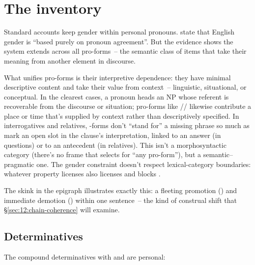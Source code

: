 \section{The inventory}
\label{sec:12:inventory}

Standard accounts keep gender within personal pronouns. \textcite[486]{huddleston2002} state that English gender is \enquote{based purely on pronoun agreement}. But the evidence shows the system extends across all pro-forms~-- the semantic class of items that take their meaning from another element in discourse.

What unifies pro-forms is their interpretive dependence: they have minimal
descriptive content and take their value from context~-- linguistic,
situational, or conceptual. In the clearest cases, a pronoun heads an NP
whose referent is recoverable from the discourse or situation; pro-forms like
// likewise contribute a place or
time that's supplied by context rather than descriptively specified. In
interrogatives and relatives, -forms don't \enquote{stand for} a missing
phrase so much as mark an open slot in the clause's interpretation, linked to
an answer (in questions) or to an antecedent (in relatives). This isn't a
morphosyntactic category (there's no frame that selects for \enquote{any pro-form}),
but a semantic--pragmatic one. The gender constraint doesn't respect lexical-category
boundaries: whatever property licenses  also licenses 
and blocks .

The skink in the epigraph illustrates exactly this: a fleeting promotion () and immediate demotion () within one sentence~-- the kind of construal shift that §\ref{sec:12:chain-coherence} will examine.

\subsection{Determinatives}
\label{sec:12:determinatives}

The compound determinatives with  and  are personal:

